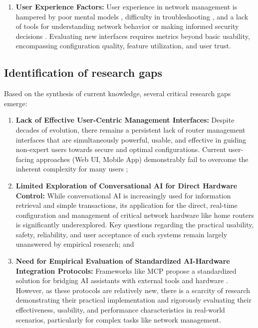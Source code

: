 \begin{enumerate}
\item \textbf{User Experience Factors:} User experience in network management is hampered by poor mental models \cite{router_logs}, difficulty in troubleshooting \cite{router_logs}, and a lack of tools for understanding network behavior or making informed security decisions \cite{router_logs}. Evaluating new interfaces requires metrics beyond basic usability, encompassing configuration quality, feature utilization, and user trust.
\end{enumerate}

\subsection{Identification of research gaps}
Based on the synthesis of current knowledge, several critical research gaps emerge:

\begin{enumerate}
\item \textbf{Lack of Effective User-Centric Management Interfaces:} Despite decades of evolution, there remains a persistent lack of router management interfaces that are simultaneously powerful, usable, and effective in guiding non-expert users towards secure and optimal configurations. Current user-facing approaches (Web UI, Mobile App) demonstrably fail to overcome the inherent complexity for many users \cite{home_network_challenges};

\item \textbf{Limited Exploration of Conversational AI for Direct Hardware Control:} While conversational AI is increasingly used for information retrieval and simple transactions, its application for the direct, real-time configuration and management of critical network hardware like home routers is significantly underexplored. Key questions regarding the practical usability, safety, reliability, and user acceptance of such systems remain largely unanswered by empirical research; and

\item \textbf{Need for Empirical Evaluation of Standardized AI-Hardware Integration Protocols:} Frameworks like MCP propose a standardized solution for bridging AI assistants with external tools and hardware \cite{mcp_docs}. However, as these protocols are relatively new, there is a scarcity of research demonstrating their practical implementation and rigorously evaluating their effectiveness, usability, and performance characteristics in real-world scenarios, particularly for complex tasks like network management.
\end{enumerate}

